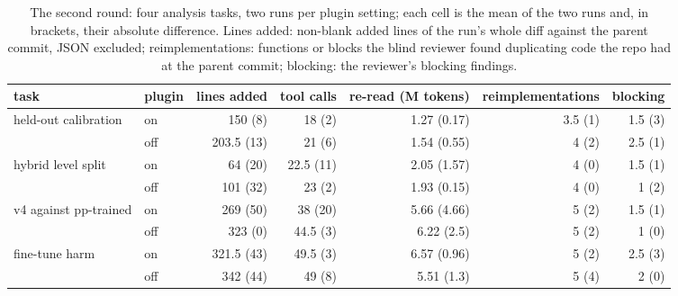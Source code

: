 \documentclass[11pt]{article}
\begin{document}
\begin{table}[H]
\centering
\begin{tabular}{llrrrrr}
task & plugin & lines added & tool calls & re-read (M tokens) & reimplementations & blocking \\
\hline
held-out calibration & on & 150 (8) & 18 (2) & 1.27 (0.17) & 3.5 (1) & 1.5 (3) \\
 & off & 203.5 (13) & 21 (6) & 1.54 (0.55) & 4 (2) & 2.5 (1) \\
hybrid level split & on & 64 (20) & 22.5 (11) & 2.05 (1.57) & 4 (0) & 1.5 (1) \\
 & off & 101 (32) & 23 (2) & 1.93 (0.15) & 4 (0) & 1 (2) \\
v4 against pp-trained & on & 269 (50) & 38 (20) & 5.66 (4.66) & 5 (2) & 1.5 (1) \\
 & off & 323 (0) & 44.5 (3) & 6.22 (2.5) & 5 (2) & 1 (0) \\
fine-tune harm & on & 321.5 (43) & 49.5 (3) & 6.57 (0.96) & 5 (2) & 2.5 (3) \\
 & off & 342 (44) & 49 (8) & 5.51 (1.3) & 5 (4) & 2 (0) \\
\end{tabular}
\caption{The second round: four analysis tasks, two runs per plugin setting; each cell is the mean of the two runs and,
in brackets, their absolute difference. Lines added: non-blank added lines of the run's whole diff against the parent
commit, JSON excluded; reimplementations: functions or blocks the blind reviewer found duplicating code the repo had at
the parent commit; blocking: the reviewer's blocking findings.}
\label{tab:ponytail_ab2}
\end{table}

\end{document}
